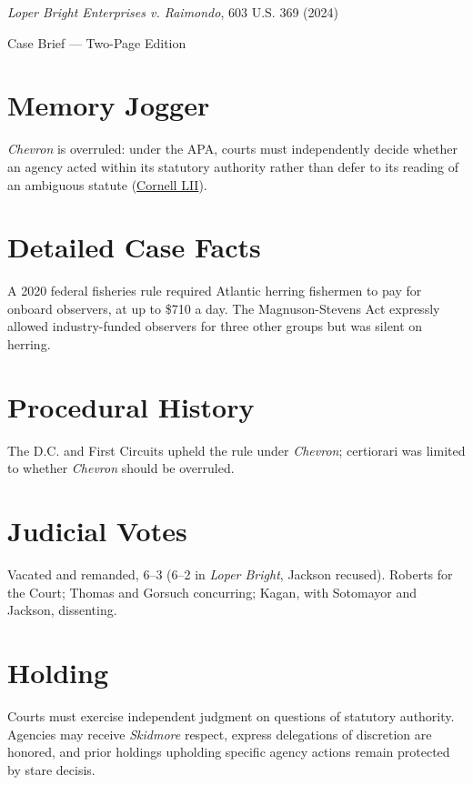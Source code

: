 \documentclass[12pt]{article}
\begin{document}
\begin{center}
{\LARGE \textit{Loper Bright Enterprises v. Raimondo}, 603 U.S. 369 (2024)\par}
\vspace{0.5em}
{\large Case Brief --- Two-Page Edition\par}
\end{center}

\section{Memory Jogger}
\textit{Chevron} is overruled: under the APA, courts must independently decide whether an agency acted within its statutory authority rather than defer to its reading of an ambiguous statute (\href{https://www.law.cornell.edu/supremecourt/text/22-451}{Cornell LII}).

\section{Detailed Case Facts}
A 2020 federal fisheries rule required Atlantic herring fishermen to pay for onboard observers, at up to \$710 a day. The Magnuson-Stevens Act expressly allowed industry-funded observers for three other groups but was silent on herring.

\section{Procedural History}
The D.C. and First Circuits upheld the rule under \textit{Chevron}; certiorari was limited to whether \textit{Chevron} should be overruled.

\section{Judicial Votes}
Vacated and remanded, 6--3 (6--2 in \textit{Loper Bright}, Jackson recused). Roberts for the Court; Thomas and Gorsuch concurring; Kagan, with Sotomayor and Jackson, dissenting.

\section{Holding}
Courts must exercise independent judgment on questions of statutory authority. Agencies may receive \textit{Skidmore} respect, express delegations of discretion are honored, and prior holdings upholding specific agency actions remain protected by stare decisis.
\end{document}
